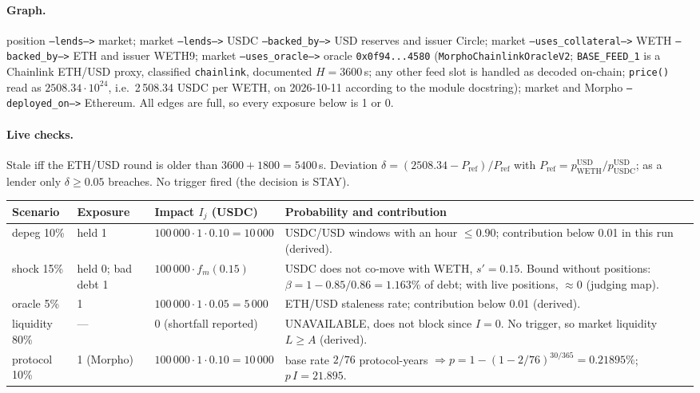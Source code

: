\documentclass[11pt,a4paper]{article}
\newcommand{\code}[1]{\texttt{#1}}
\begin{document}
\paragraph{Graph.} position \code{--lends-->} market; market \code{--lends-->}
USDC \code{--backed\_by-->} USD reserves and issuer Circle; market
\code{--uses\_collateral-->} WETH \code{--backed\_by-->} ETH and issuer WETH9;
market \code{--uses\_oracle-->} oracle \code{0x0f94...4580}
(\code{MorphoChainlinkOracleV2}; \code{BASE\_FEED\_1} is a Chainlink ETH/USD proxy,
classified \code{chainlink}, documented $H=3600$\,s; any other feed slot is
handled as decoded on-chain; \code{price()} read as
$2508.34\cdot10^{24}$, i.e.\ 2\,508.34 USDC per WETH, on 2026-10-11 according to the
module docstring); market and Morpho \code{--deployed\_on-->} Ethereum. All edges
are full, so every exposure below is 1 or 0.

\paragraph{Live checks.} Stale iff the ETH/USD round is older than
$3600+1800=5400$\,s. Deviation $\delta=(2508.34-P_{\text{ref}})/P_{\text{ref}}$
with $P_{\text{ref}}=p^{\text{USD}}_{\text{WETH}}/p^{\text{USD}}_{\text{USDC}}$; as a
lender only $\delta\geq0.05$ breaches. No trigger fired (the decision is STAY).

\begin{center}\small
\begin{tabularx}{\textwidth}{@{}L{2.4cm}L{1.6cm}L{3.6cm}Y@{}}
\toprule
Scenario & Exposure & Impact $I_j$ (USDC) & Probability and contribution \\
\midrule
depeg 10\% & held 1 & $100\,000\cdot1\cdot0.10=10\,000$ & USDC/USD windows with an hour $\leq0.90$; contribution below 0.01 in this run (derived). \\
shock 15\% & held 0; bad debt 1 & $100\,000\cdot f_m(0.15)$ & USDC does not co-move with WETH, $s'=0.15$. Bound without positions: $\beta=1-0.85/0.86=1.163\%$ of debt; with live positions, $\approx0$ (judging map). \\
oracle 5\% & 1 & $100\,000\cdot1\cdot0.05=5\,000$ & ETH/USD staleness rate; contribution below 0.01 (derived). \\
liquidity 80\% & --- & 0 (shortfall reported) & UNAVAILABLE, does not block since $I=0$. No trigger, so market liquidity $L\geq A$ (derived). \\
protocol 10\% & 1 (Morpho) & $100\,000\cdot1\cdot0.10=10\,000$ & base rate $2/76$ protocol-years $\Rightarrow p=1-(1-2/76)^{30/365}=0.21895\%$; $p\,I=21.895$. \\
\bottomrule
\end{tabularx}
\end{center}
\end{document}
